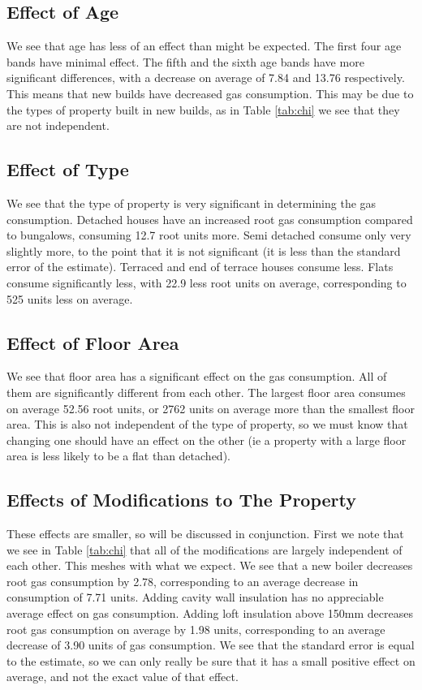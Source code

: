 \documentclass[]{extarticle}
\begin{document}
\subsection{Effect of Age}
We see that age has less of an effect than might be expected. The first four age bands have minimal effect. The fifth and the sixth age bands have more significant differences, with a decrease on average of 7.84 and 13.76 respectively. This means that new builds have decreased gas consumption. This may be due to the types of property built in new builds, as in Table \ref{tab:chi} we see that they are not independent.

\subsection{Effect of Type}
We see that the type of property is very significant in determining the gas consumption. Detached houses have an increased root gas consumption compared to bungalows, consuming 12.7 root units more. Semi detached consume only very slightly more, to the point that it is not significant (it is less than the standard error of the estimate). Terraced and end of terrace houses consume less. Flats consume significantly less, with 22.9 less root units on average, corresponding to 525 units less on average. 

\subsection{Effect of Floor Area}
We see that floor area has a significant effect on the gas consumption. All of them are significantly different from each other. The largest floor area consumes on average 52.56 root units, or 2762 units on average more than the smallest floor area. This is also not independent of the type of property, so we must know that changing one should have an effect on the other (ie a property with a large floor area is less likely to be a flat than detached).

\subsection{Effects of Modifications to The Property}
These effects are smaller, so will be discussed in conjunction. First we note that we see in Table \ref{tab:chi} that all of the modifications are largely independent of each other. This meshes with what we expect. We see that a new boiler decreases root gas consumption by 2.78, corresponding to an average decrease in consumption of 7.71 units. Adding cavity wall insulation has no appreciable average effect on gas consumption. Adding loft insulation above 150mm decreases root gas consumption on average by 1.98 units, corresponding to an average decrease of 3.90 units of gas consumption. We see that the standard error is equal to the estimate, so we can only really be sure that it has a small positive effect on average, and not the exact value of that effect.
\end{document}

